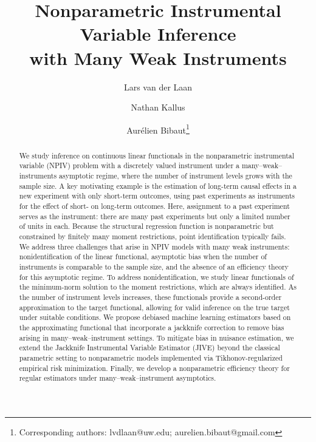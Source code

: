 \documentclass[11pt]{article}
\title{Nonparametric Instrumental Variable Inference\\with Many Weak Instruments}
\author[1,2]{Lars van der Laan}
\author[1,3]{Nathan Kallus}
\author[1]{Aurélien Bibaut\thanks{Corresponding authors: lvdlaan@uw.edu; aurelien.bibaut@gmail.com}}
\affil[1]{Netflix Research, USA}
\affil[2]{Department of Statistics, University of Washington, USA}
\affil[3]{Cornell Tech, Cornell University, USA}
\theoremstyle{plain}
\theoremstyle{definition}
\theoremstyle{remark}
\theoremstyle{definition}
\newcommand{\slightspacing}{\setstretch{1.175}}
\begin{document}
\slightspacing
\maketitle

\begin{abstract}
\singlespacing
 


We study inference on continuous linear functionals in the nonparametric
instrumental variable (NPIV) problem with a discretely valued instrument under a
many--weak--instruments asymptotic regime, where the number of instrument levels
grows with the sample size. A key motivating example is the estimation of
long-term causal effects in a new experiment with only short-term outcomes,
using past experiments as instruments for the effect of short- on long-term
outcomes. Here, assignment to a past experiment serves as the instrument: there
are many past experiments but only a limited number of units in each. Because
the structural regression function is nonparametric but constrained by finitely
many moment restrictions, point identification typically fails. We address three challenges that arise in NPIV models with many weak
instruments: nonidentification of the linear functional, asymptotic bias when
the number of instruments is comparable to the sample size, and the absence of
an efficiency theory for this asymptotic regime. To address nonidentification,
we study linear functionals of the minimum-norm solution to the moment
restrictions, which are always identified. As the number of instrument levels
increases, these functionals provide a second-order approximation to the target
functional, allowing for valid inference on the true target under suitable
conditions. We propose debiased machine learning estimators based on the
approximating functional that incorporate a jackknife correction to remove
bias arising in many--weak--instrument settings. To mitigate bias in nuisance
estimation, we extend the Jackknife Instrumental Variable Estimator (JIVE)
beyond the classical parametric setting to nonparametric models implemented via
Tikhonov-regularized empirical risk minimization. Finally, we develop a
nonparametric efficiency theory for regular estimators under
many--weak--instrument asymptotics.






 



\end{abstract}
\end{document}
